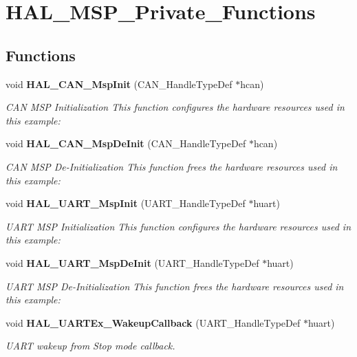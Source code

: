 \section{H\+A\+L\+\_\+\+M\+S\+P\+\_\+\+Private\+\_\+\+Functions}
\label{group___h_a_l___m_s_p___private___functions}
\subsection*{Functions}
\begin{DoxyCompactItemize}
\item 
void \textbf{ H\+A\+L\+\_\+\+C\+A\+N\+\_\+\+Msp\+Init} (C\+A\+N\+\_\+\+Handle\+Type\+Def $\ast$hcan)
\begin{DoxyCompactList}\small\item\em C\+AN M\+SP Initialization This function configures the hardware resources used in this example\+: \end{DoxyCompactList}\item 
void \textbf{ H\+A\+L\+\_\+\+C\+A\+N\+\_\+\+Msp\+De\+Init} (C\+A\+N\+\_\+\+Handle\+Type\+Def $\ast$hcan)
\begin{DoxyCompactList}\small\item\em C\+AN M\+SP De-\/\+Initialization This function frees the hardware resources used in this example\+: \end{DoxyCompactList}\item 
void \textbf{ H\+A\+L\+\_\+\+U\+A\+R\+T\+\_\+\+Msp\+Init} (U\+A\+R\+T\+\_\+\+Handle\+Type\+Def $\ast$huart)
\begin{DoxyCompactList}\small\item\em U\+A\+RT M\+SP Initialization This function configures the hardware resources used in this example\+: \end{DoxyCompactList}\item 
void \textbf{ H\+A\+L\+\_\+\+U\+A\+R\+T\+\_\+\+Msp\+De\+Init} (U\+A\+R\+T\+\_\+\+Handle\+Type\+Def $\ast$huart)
\begin{DoxyCompactList}\small\item\em U\+A\+RT M\+SP De-\/\+Initialization This function frees the hardware resources used in this example\+: \end{DoxyCompactList}\item 
void \textbf{ H\+A\+L\+\_\+\+U\+A\+R\+T\+Ex\+\_\+\+Wakeup\+Callback} (U\+A\+R\+T\+\_\+\+Handle\+Type\+Def $\ast$huart)
\begin{DoxyCompactList}\small\item\em U\+A\+RT wakeup from Stop mode callback. \end{DoxyCompactList}\item 

\end{DoxyCompactItemize}
